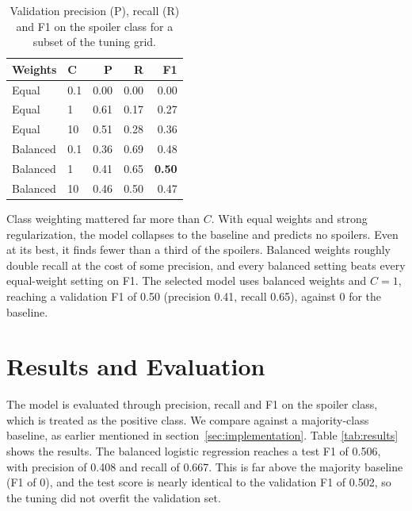 \documentclass[11pt]{article}
\begin{document}
\begin{table}[t]
  \centering
  \small
  \begin{tabular}{llrrr}
    \hline
    \textbf{Weights} & $\mathbf{C}$ & \textbf{P} & \textbf{R} & \textbf{F1} \\
    \hline
    Equal    & 0.1 & 0.00 & 0.00 & 0.00 \\
    Equal    & 1   & 0.61 & 0.17 & 0.27 \\
    Equal    & 10  & 0.51 & 0.28 & 0.36 \\
    Balanced & 0.1 & 0.36 & 0.69 & 0.48 \\
    Balanced & 1   & 0.41 & 0.65 & \textbf{0.50} \\
    Balanced & 10  & 0.46 & 0.50 & 0.47 \\
    \hline
  \end{tabular}
  \caption{\label{tab:tuning}Validation precision (P), recall (R) and F1 on the spoiler class for a subset of the tuning grid.}
\end{table}

Class weighting mattered far more than $C$. With equal weights and strong regularization, the model collapses to the baseline and predicts no spoilers. Even at its best, it finds fewer than a third of the spoilers. Balanced weights roughly double recall at the cost of some precision, and every balanced setting beats every equal-weight setting on F1. The selected model uses balanced weights and $C=1$, reaching a validation F1 of 0.50 (precision 0.41, recall 0.65), against 0 for the baseline.

\section{Results and Evaluation}


The model is evaluated through precision, recall and F1 on the spoiler class, which is treated as the positive class. We compare against a majority-class baseline, as earlier mentioned in section~\ref{sec:implementation}. Table \ref{tab:results} shows the results. The balanced logistic regression reaches a test F1 of 0.506, with precision of 0.408 and recall of 0.667. This is far above the majority baseline (F1 of 0), and the test score is nearly identical to the validation F1 of 0.502, so the tuning did not overfit the validation set. 
\end{document}
